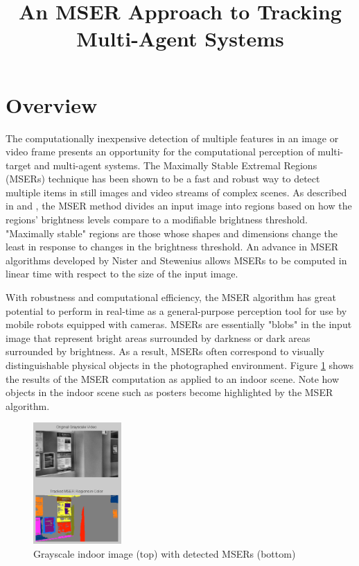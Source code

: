 \documentclass[conference]{IEEEtran}
\begin{document}
\title{\LARGE \textbf{An MSER Approach to Tracking Multi-Agent Systems} \vspace{0ex}}

\maketitle

\section{Overview}

The computationally inexpensive detection of multiple features in an image or video frame presents an opportunity for the computational perception of multi-target and multi-agent systems. The Maximally Stable Extremal Regions (MSERs) technique has been shown to be a fast and robust way to detect multiple items in still images and video streams of complex scenes. As described in \cite{Matas02bmvc} and \cite{Donoser06cvpr}, the MSER method divides an input image into regions based on how the regions' brightness levels compare to a modifiable brightness threshold. "Maximally stable" regions are those whose shapes and dimensions change the least in response to changes in the brightness threshold. An advance in MSER algorithms developed by Nister and Stewenius \cite{Nister08eccv} allows MSERs to be computed in linear time with respect to the size of the input image. 

With robustness and computational efficiency, the MSER algorithm has great potential to perform in real-time as a general-purpose perception tool for use by mobile robots equipped with cameras. MSERs are essentially "blobs" in the input image that represent bright areas surrounded by darkness or dark areas surrounded by brightness. As a result, MSERs often correspond to visually distinguishable physical objects in the photographed environment. Figure \ref{fig:1} shows the results of the MSER computation as applied to an indoor scene. Note how objects in the indoor scene such as posters become highlighted by the MSER algorithm. 

\begin{figure}[ht]
\centering
\includegraphics[width=0.3\textwidth]{MSER_Indoor.png}
\caption{Grayscale indoor image (top) with detected MSERs (bottom)}
\label{fig:1}
\vfill
\end{figure}
\end{document}

